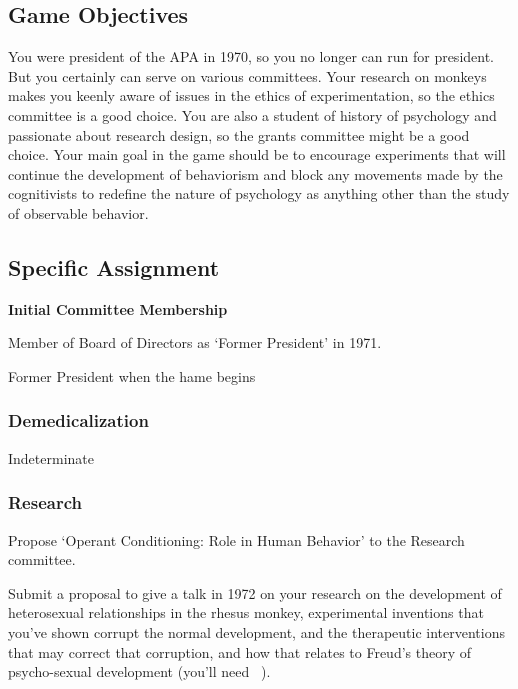 \begin{refsection}
\section{Game Objectives}
\label{gameobjectives}

You were president of the APA in 1970, so you no longer can run for president. But you certainly can serve on various committees. Your research on monkeys makes you keenly aware of issues in the ethics of experimentation, so the ethics committee is a good choice. You are also a student of history of psychology and passionate about research design, so the grants committee might be a good choice. Your main goal in the game should be to encourage experiments that will continue the development of behaviorism and block any movements made by the cognitivists to redefine the nature of psychology as anything other than the study of observable behavior.

\subsection{Specific Assignment}
\label{specificassignment}

\textbf{Initial Committee Membership}
\begin{service}[Harlow]\label{service:harlow}
Member of Board of Directors as ‘Former President’ in 1971.
\end{service}

Former President when the hame begins

\subsubsection{Demedicalization}
\label{demedicalization}

Indeterminate

\subsubsection{Research}
\label{research}

\begin{researchtask}[Harlow]\label{research:harllow}
Propose ‘Operant Conditioning: Role in Human Behavior’ to the Research committee.
\end{researchtask}

Submit a proposal to give a talk in 1972 on your research on the development of heterosexual relationships in the rhesus monkey, experimental inventions that you've shown corrupt the normal development, and the therapeutic interventions that may correct that corruption, and how that relates to Freud's theory of psycho-sexual development (you'll need ~\citep{Harlow:1975bm}).


\end{refsection}
